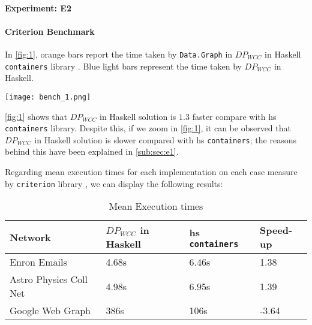 \paragraph{Experiment: E2}
\paragraph{Criterion Benchmark}
In \autoref{fig:1}, orange bars report the time taken by \texttt{Data.Graph} in $DP_{WCC}$ in Haskell \texttt{containers} library \cite{containers}. Blue light bars represent the time taken by $DP_{WCC}$ in Haskell.

\begin{minipage}[t]{\linewidth}
  \texttt{[image: bench\_1.png]}
  \captionsetup{type=figure}
  \label{fig:1}
\end{minipage}

\autoref{fig:1} shows that $DP_{WCC}$ in Haskell solution is $1.3$ faster compare with \acrshort{hs} \texttt{containers} library. Despite this, if we zoom  in \autoref{fig:1}, it can be observed that $DP_{WCC}$ in Haskell solution is slower compared with \acrshort{hs} \texttt{containers}; the reasons behind this have been explained in \autoref{sub:sec:e1}.
\iffalse
\begin{minipage}[t]{\linewidth}
  \texttt{[image: bench\_2]}
  \captionsetup{type=figure}
  \captionof{figure}{Benchmark 2 - DP in Haskell vs. Data.Graph Haskell}
  \label{fig:2}
\end{minipage}
\fi

Regarding mean execution times for each implementation on each case measure by \texttt{criterion} library \cite{criterion}, we can display the following results:

\begin{table}[H]
  \centering
  \begin{tabular}{|l|l|l|l|}
   \hline
   \textbf{Network} & \textbf{$DP_{WCC}$ in Haskell} & \textbf{\acrshort{hs} \texttt{containers}} & \textbf{Speed-up}\\
   \hline
   Enron Emails & 4.68s &  6.46s & 1.38\\
   \hline
   Astro Physics Coll Net & 4.98s & 6.95s  & 1.39\\
   \hline
   Google Web Graph & 386s & 106s & -3.64\\
   \hline
  \end{tabular}
 \caption{Mean Execution times}
 \label{table:6}
 \end{table}

